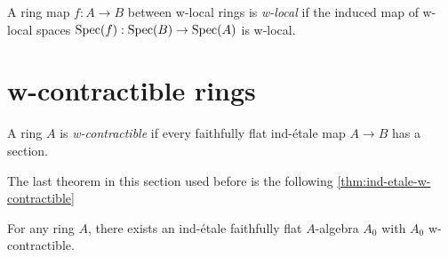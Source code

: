 \begin{definition}
    A ring map \(f: A \to B\) between w-local rings is \emph{w-local} if the induced map of w-local spaces \(\operatorname{Spec}(f) : \operatorname{Spec}(B) \to \operatorname{Spec}(A)\) is w-local.
    \label{def:w-local-ring-map}
\end{definition}

\section{w-contractible rings}

\begin{definition}
A ring \(A\) is \emph{w-contractible} if every faithfully flat ind-\'etale map \(A \to B\) has a section.
    \label{def:w-contractible-ring}
\end{definition}

The last theorem in this section used before \cite[Theorem 5.6.2]{proetale} is the following \cref{thm:ind-etale-w-contractible}

\begin{lemma}
    For any ring $A$, there exists an ind-étale faithfully flat $A$-algebra $A_0$ with $A_0$ w-contractible.
    \label{thm:ind-etale-w-contractible-cover-exists}
\end{lemma}

